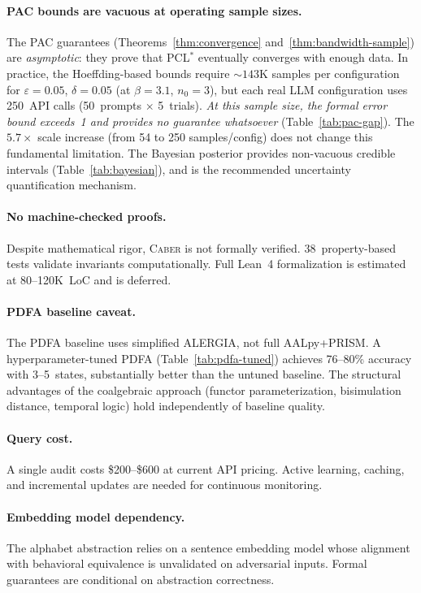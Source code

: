 \documentclass[11pt]{article}
\newcommand{\tool}{\textsc{Caber}}
\newcommand{\pclstar}{PCL$^*$}
\begin{document}
\paragraph{PAC bounds are vacuous at operating sample sizes.}
The PAC guarantees (Theorems~\ref{thm:convergence}
and~\ref{thm:bandwidth-sample}) are \emph{asymptotic}: they prove
that \pclstar{} eventually converges with enough data. In practice,
the Hoeffding-based bounds require ${\sim}143$K samples per
configuration for $\varepsilon{=}0.05$, $\delta{=}0.05$ (at
$\beta{=}3.1$, $n_0{=}3$), but each real LLM configuration uses
250~API calls (50~prompts $\times$ 5~trials).
\emph{At this sample size, the formal error bound
exceeds~1 and provides no guarantee whatsoever}
(Table~\ref{tab:pac-gap}).  The $5.7{\times}$ scale increase
(from 54 to 250 samples/config) does not change this fundamental
limitation.
The Bayesian posterior provides non-vacuous
credible intervals (Table~\ref{tab:bayesian}), and is the
recommended uncertainty quantification mechanism.

\paragraph{No machine-checked proofs.}
Despite mathematical rigor, \tool{} is not formally verified.
38~property-based tests validate invariants computationally.
Full Lean~4 formalization is estimated at 80--120K~LoC and is deferred.

\paragraph{PDFA baseline caveat.}
The PDFA baseline uses simplified ALERGIA, not full AALpy+PRISM.
A hyperparameter-tuned PDFA (Table~\ref{tab:pdfa-tuned}) achieves
76--80\% accuracy with 3--5~states, substantially better than the
untuned baseline.  The structural advantages of the coalgebraic
approach (functor parameterization, bisimulation distance, temporal
logic) hold independently of baseline quality.

\paragraph{Query cost.}
A single audit costs \$200--\$600 at current API pricing.  Active
learning, caching, and incremental updates are needed for continuous
monitoring.

\paragraph{Embedding model dependency.}
The alphabet abstraction relies on a sentence embedding model
whose alignment with behavioral equivalence is unvalidated on
adversarial inputs.  Formal guarantees are conditional on
abstraction correctness.
\end{document}
